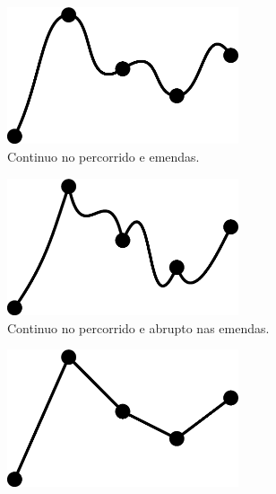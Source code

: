 \begin{figure}[!h]
     \centering
     \begin{subfigure}[b]{0.35\textwidth}
         \centering
         \includegraphics[width=0.75\textwidth]{chapters/cap-musicalidade/continudade-a.eps}
         \caption{Continuo no percorrido e emendas.}
         \label{fig:continudade-a}
     \end{subfigure}
     \hfill
     \begin{subfigure}[b]{0.35\textwidth}
         \centering
         \includegraphics[width=0.75\textwidth]{chapters/cap-musicalidade/continudade-b.eps}
         \caption{Continuo no percorrido e abrupto nas emendas.}
         \label{fig:continudade-b}
     \end{subfigure}
     \hfill
     \begin{subfigure}[b]{0.35\textwidth}
         \centering
         \includegraphics[width=0.75\textwidth]{chapters/cap-musicalidade/continudade-c.eps}

\end{subfigure}
\end{figure}

